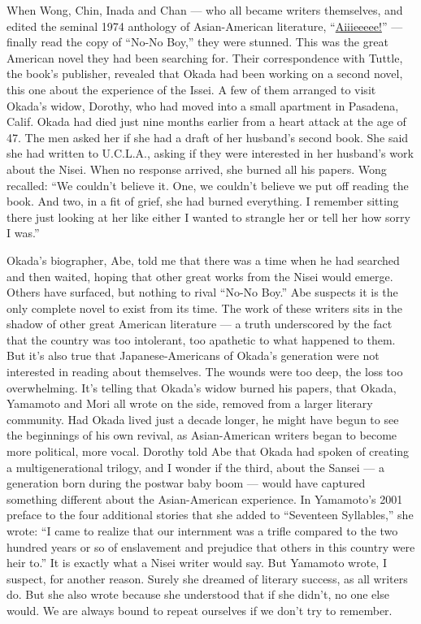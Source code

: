 When Wong, Chin, Inada and Chan --- who all became writers themselves,
and edited the seminal 1974 anthology of Asian-American literature,
``\href{https://www.barnesandnoble.com/w/aiiieeeee-frank-chin/1131510723}{Aiiieeeee!}''
--- finally read the copy of ``No-No Boy,'' they were stunned. This was
the great American novel they had been searching for. Their
correspondence with Tuttle, the book's publisher, revealed that Okada
had been working on a second novel, this one about the experience of the
Issei. A few of them arranged to visit Okada's widow, Dorothy, who had
moved into a small apartment in Pasadena, Calif. Okada had died just
nine months earlier from a heart attack at the age of 47. The men asked
her if she had a draft of her husband's second book. She said she had
written to U.C.L.A., asking if they were interested in her husband's
work about the Nisei. When no response arrived, she burned all his
papers. Wong recalled: ``We couldn't believe it. One, we couldn't
believe we put off reading the book. And two, in a fit of grief, she had
burned everything. I remember sitting there just looking at her like
either I wanted to strangle her or tell her how sorry I was.''

Okada's biographer, Abe, told me that there was a time when he had
searched and then waited, hoping that other great works from the Nisei
would emerge. Others have surfaced, but nothing to rival ``No-No Boy.''
Abe suspects it is the only complete novel to exist from its time. The
work of these writers sits in the shadow of other great American
literature --- a truth underscored by the fact that the country was too
intolerant, too apathetic to what happened to them. But it's also true
that Japanese-Americans of Okada's generation were not interested in
reading about themselves. The wounds were too deep, the loss too
overwhelming. It's telling that Okada's widow burned his papers, that
Okada, Yamamoto and Mori all wrote on the side, removed from a larger
literary community. Had Okada lived just a decade longer, he might have
begun to see the beginnings of his own revival, as Asian-American
writers began to become more political, more vocal. Dorothy told Abe
that Okada had spoken of creating a multigenerational trilogy, and I
wonder if the third, about the Sansei --- a generation born during the
postwar baby boom --- would have captured something different about the
Asian-American experience. In Yamamoto's 2001 preface to the four
additional stories that she added to ``Seventeen Syllables,'' she wrote:
``I came to realize that our internment was a trifle compared to the two
hundred years or so of enslavement and prejudice that others in this
country were heir to.'' It is exactly what a Nisei writer would say. But
Yamamoto wrote, I suspect, for another reason. Surely she dreamed of
literary success, as all writers do. But she also wrote because she
understood that if she didn't, no one else would. We are always bound to
repeat ourselves if we don't try to remember.

